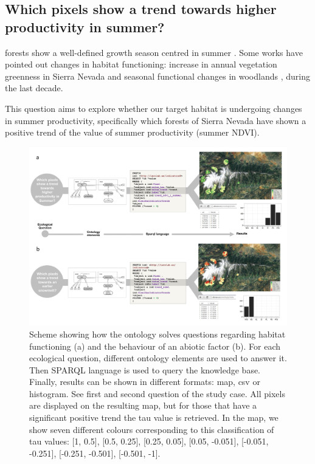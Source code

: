 \subsection{Which pixels show a trend towards higher productivity in summer?}\label{sec:onto:Trends}

\Qp forests show a well-defined growth season centred in summer \autocite{Alcarazetal2006IdentificationCurrent,Dionisioetal2012SatelliteBasedMonitoring}. Some works have pointed out changes in habitat functioning: increase in annual vegetation greenness in Sierra Nevada \autocite{AlcarazSeguraetal2008TrendsSurface,AlcarazSeguraetal2010EvaluatingConsistency} and seasonal functional changes in \Qp woodlands \autocite{Marty2008RegimeShift}, during the last decade.

This question aims to explore whether our target habitat is undergoing changes in summer productivity, specifically which \Qp forests of Sierra Nevada have shown a positive trend of the value of summer productivity (summer NDVI).

\begin{figure}
\centering
\includegraphics[width=.8\textwidth]{img/onto/onto-case-study}\caption{Scheme showing how the ontology solves questions regarding habitat functioning (a) and the behaviour of an abiotic factor (b). For each ecological question, different ontology elements are used to answer it. Then SPARQL language is used to query the knowledge base. Finally, results can be shown in different formats: map, csv or histogram. See first and second question of the study case. All pixels are displayed on the resulting map, but for those that have a significant positive trend the tau value is retrieved. In the map, we show seven different colours corresponding to this classification of tau values: [1, 0.5], [0.5, 0.25], [0.25, 0.05], [0.05, -0.051], [-0.051, -0.251], [-0.251, -0.501], [-0.501, -1].}\label{fig:onto:casestudy}
\end{figure}

